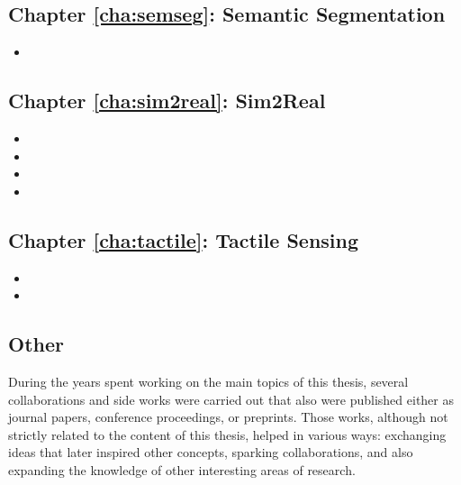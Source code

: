 \subsection{Chapter \ref{cha:semseg}: Semantic Segmentation}

\begin{itemize}
  \item {}
\end{itemize}

\subsection{Chapter \ref{cha:sim2real}: Sim2Real}

\begin{itemize}
    \item {}
    \item {}
    \item {}
    \item {}
  \end{itemize}

\subsection{Chapter \ref{cha:tactile}: Tactile Sensing}

\begin{itemize}
  \item {}
  \item {}
\end{itemize}

\subsection{Other}

During the years spent working on the main topics of this thesis, several collaborations and side works were carried out that also were published either as journal papers, conference proceedings, or preprints. Those works, although not strictly related to the content of this thesis, helped in various ways: exchanging ideas that later inspired other concepts, sparking collaborations, and also expanding the knowledge of other interesting areas of research.


